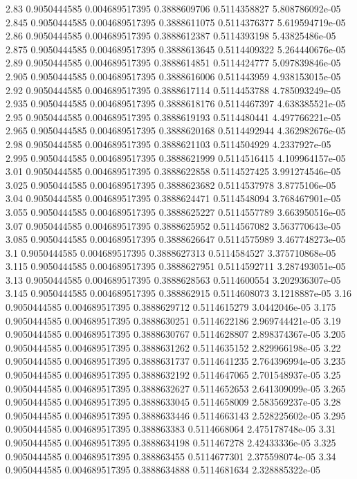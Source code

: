 {2.83 0.9050444585 0.004689517395 0.3888609706 0.5114358827 5.808786092e-05
2.845 0.9050444585 0.004689517395 0.3888611075 0.5114376377 5.619594719e-05
2.86 0.9050444585 0.004689517395 0.3888612387 0.5114393198 5.43825486e-05
2.875 0.9050444585 0.004689517395 0.3888613645 0.5114409322 5.264440676e-05
2.89 0.9050444585 0.004689517395 0.3888614851 0.5114424777 5.097839846e-05
2.905 0.9050444585 0.004689517395 0.3888616006 0.511443959 4.938153015e-05
2.92 0.9050444585 0.004689517395 0.3888617114 0.5114453788 4.785093249e-05
2.935 0.9050444585 0.004689517395 0.3888618176 0.5114467397 4.638385521e-05
2.95 0.9050444585 0.004689517395 0.3888619193 0.5114480441 4.497766221e-05
2.965 0.9050444585 0.004689517395 0.3888620168 0.5114492944 4.362982676e-05
2.98 0.9050444585 0.004689517395 0.3888621103 0.5114504929 4.2337927e-05
2.995 0.9050444585 0.004689517395 0.3888621999 0.5114516415 4.109964157e-05
3.01 0.9050444585 0.004689517395 0.3888622858 0.5114527425 3.991274546e-05
3.025 0.9050444585 0.004689517395 0.3888623682 0.5114537978 3.8775106e-05
3.04 0.9050444585 0.004689517395 0.3888624471 0.5114548094 3.768467901e-05
3.055 0.9050444585 0.004689517395 0.3888625227 0.5114557789 3.663950516e-05
3.07 0.9050444585 0.004689517395 0.3888625952 0.5114567082 3.563770643e-05
3.085 0.9050444585 0.004689517395 0.3888626647 0.5114575989 3.467748273e-05
3.1 0.9050444585 0.004689517395 0.3888627313 0.5114584527 3.375710868e-05
3.115 0.9050444585 0.004689517395 0.3888627951 0.5114592711 3.287493051e-05
3.13 0.9050444585 0.004689517395 0.3888628563 0.5114600554 3.202936307e-05
3.145 0.9050444585 0.004689517395 0.388862915 0.5114608073 3.1218887e-05
3.16 0.9050444585 0.004689517395 0.3888629712 0.5114615279 3.0442046e-05
3.175 0.9050444585 0.004689517395 0.3888630251 0.5114622186 2.969744421e-05
3.19 0.9050444585 0.004689517395 0.3888630767 0.5114628807 2.898374367e-05
3.205 0.9050444585 0.004689517395 0.3888631262 0.5114635152 2.829966198e-05
3.22 0.9050444585 0.004689517395 0.3888631737 0.5114641235 2.764396994e-05
3.235 0.9050444585 0.004689517395 0.3888632192 0.5114647065 2.701548937e-05
3.25 0.9050444585 0.004689517395 0.3888632627 0.5114652653 2.641309099e-05
3.265 0.9050444585 0.004689517395 0.3888633045 0.5114658009 2.583569237e-05
3.28 0.9050444585 0.004689517395 0.3888633446 0.5114663143 2.528225602e-05
3.295 0.9050444585 0.004689517395 0.388863383 0.5114668064 2.475178748e-05
3.31 0.9050444585 0.004689517395 0.3888634198 0.511467278 2.42433336e-05
3.325 0.9050444585 0.004689517395 0.388863455 0.5114677301 2.375598074e-05
3.34 0.9050444585 0.004689517395 0.3888634888 0.5114681634 2.328885322e-05
}
